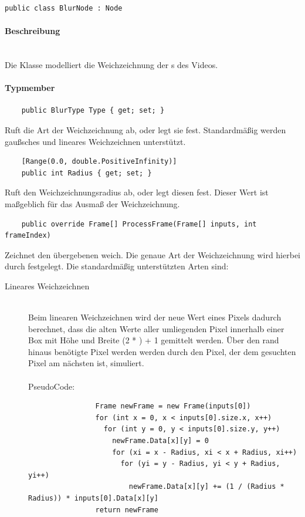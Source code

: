 \begin{verbatim}
public class BlurNode : Node
\end{verbatim}

\paragraph{Beschreibung}~\\
Die Klasse  modelliert die Weichzeichnung der s des Videos.

\paragraph{Typmember}
\begin{itemize}

	\begin{verbatim}
	public BlurType Type { get; set; }
	\end{verbatim}
	Ruft die Art der Weichzeichnung ab, oder legt sie fest. Standardmäßig werden gaußsches und lineares Weichzeichnen unterstützt.
	
	\begin{verbatim}
	[Range(0.0, double.PositiveInfinity)]
	public int Radius { get; set; }
	\end{verbatim}
	Ruft den Weichzeichnungsradius ab, oder legt diesen fest. Dieser Wert ist maßgeblich für das Ausmaß der Weichzeichnung.

	\begin{verbatim}
	public override Frame[] ProcessFrame(Frame[] inputs, int frameIndex)
	\end{verbatim}
	Zeichnet den übergebenen  weich. Die genaue Art der Weichzeichnung wird hierbei durch  festgelegt. Die standardmäßig unterstützten Arten sind:
	\begin{description}
		\item[Lineares Weichzeichnen]~\\
			Beim linearen Weichzeichnen wird der neue Wert eines Pixels dadurch berechnet, dass die alten Werte aller umliegenden Pixel innerhalb einer Box mit Höhe und Breite (2 * ) + 1 gemittelt werden. Über den rand hinaus benötigte Pixel werden werden durch den Pixel, der dem gesuchten Pixel am nächsten ist, simuliert. ~\\~\\
			PseudoCode:
			\begin{verbatim}
				Frame newFrame = new Frame(inputs[0])
				for (int x = 0, x < inputs[0].size.x, x++)
				  for (int y = 0, y < inputs[0].size.y, y++)
				    newFrame.Data[x][y] = 0
				    for (xi = x - Radius, xi < x + Radius, xi++)
				      for (yi = y - Radius, yi < y + Radius, yi++)
				        newFrame.Data[x][y] += (1 / (Radius * Radius)) * inputs[0].Data[x][y]
				return newFrame
				

\end{verbatim}
\end{description}
\end{itemize}
